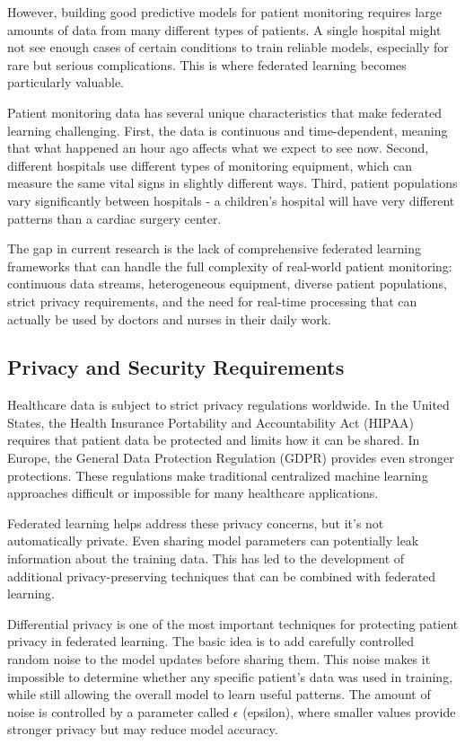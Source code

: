 \documentclass[3p,times,procedia]{elsarticle}
\begin{document}
However, building good predictive models for patient monitoring requires large amounts of data from many different types of patients. A single hospital might not see enough cases of certain conditions to train reliable models, especially for rare but serious complications. This is where federated learning becomes particularly valuable.

Patient monitoring data has several unique characteristics that make federated learning challenging. First, the data is continuous and time-dependent, meaning that what happened an hour ago affects what we expect to see now. Second, different hospitals use different types of monitoring equipment, which can measure the same vital signs in slightly different ways. Third, patient populations vary significantly between hospitals - a children's hospital will have very different patterns than a cardiac surgery center.

The gap in current research is the lack of comprehensive federated learning frameworks that can handle the full complexity of real-world patient monitoring: continuous data streams, heterogeneous equipment, diverse patient populations, strict privacy requirements, and the need for real-time processing that can actually be used by doctors and nurses in their daily work.

\subsection{Privacy and Security Requirements}

Healthcare data is subject to strict privacy regulations worldwide. In the United States, the Health Insurance Portability and Accountability Act (HIPAA) requires that patient data be protected and limits how it can be shared. In Europe, the General Data Protection Regulation (GDPR) provides even stronger protections. These regulations make traditional centralized machine learning approaches difficult or impossible for many healthcare applications.

Federated learning helps address these privacy concerns, but it's not automatically private. Even sharing model parameters can potentially leak information about the training data. This has led to the development of additional privacy-preserving techniques that can be combined with federated learning.

Differential privacy is one of the most important techniques for protecting patient privacy in federated learning. The basic idea is to add carefully controlled random noise to the model updates before sharing them. This noise makes it impossible to determine whether any specific patient's data was used in training, while still allowing the overall model to learn useful patterns. The amount of noise is controlled by a parameter called $\epsilon$ (epsilon), where smaller values provide stronger privacy but may reduce model accuracy.
\end{document}
